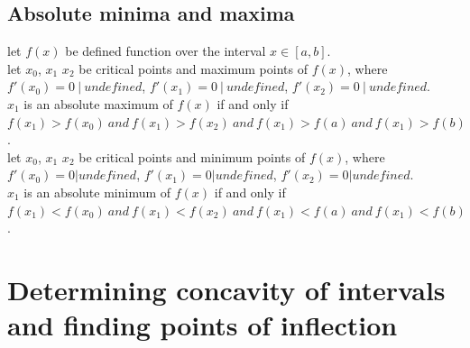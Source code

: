 \documentclass{article}
\begin{document}
    \subsection{Absolute minima and maxima}
        let \(f(x)\) be defined function over the interval  \(x \in [a, b]\).\\ 
        let \(x_0\), \(x_1\) \(x_2\) be critical points and maximum points of \(f(x)\), where \(f'(x_0) = 0 \ | \ undefined\), \(f'(x_1) = 0 \ | \ undefined\), \(f'(x_2) = 0 \ | \ undefined\).\\
        \(x_1\) is an absolute maximum of \(f(x)\) if and only if \(f(x_1) > f(x_0)\ and \ f(x_1) > f(x_2)\ and \ f(x_1) > f(a)\ and \ f(x_1) > f(b)\).\\
        let \(x_0\), \(x_1\) \(x_2\) be critical points and minimum points of \(f(x)\), where \(f'(x_0) = 0 | undefined\), \(f'(x_1) = 0 | undefined\), \(f'(x_2) = 0  | undefined\).\\
        \(x_1\) is an absolute minimum of \(f(x)\) if and only if \(f(x_1) < f(x_0)\ and \ f(x_1) < f(x_2)\ and \ f(x_1) < f(a)\ and \ f(x_1) < f(b)\).
\section{Determining concavity of intervals and finding points of inflection}
\end{document}
